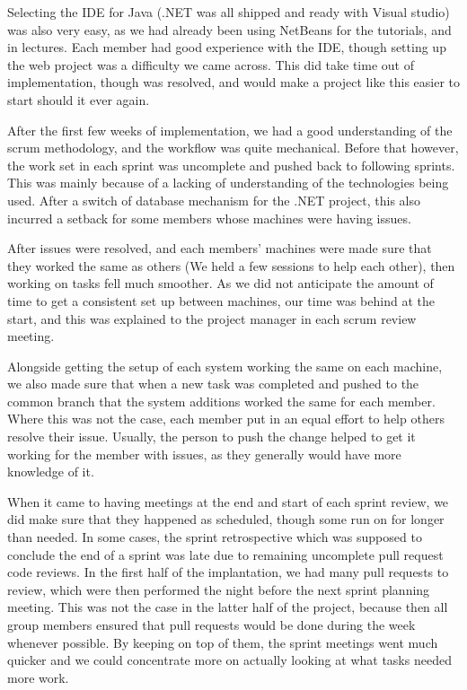 Selecting the IDE for Java (.NET was all shipped and ready with Visual studio) was also very easy, as we had already been using NetBeans for the tutorials, and in lectures. Each member had good experience with the IDE, though setting up the web project was a difficulty we came across. This did take time out of implementation, though was resolved, and would make a project like this easier to start should it ever again. \par
After the first few weeks of implementation, we had a good understanding of the scrum methodology, and the workflow was quite mechanical. Before that however, the work set in each sprint was uncomplete and pushed back to following sprints. This was mainly because of a lacking of understanding of the technologies being used. After a switch of database mechanism for the .NET project, this also incurred a setback for some members whose machines were having issues. \par
After issues were resolved, and each members’ machines were made sure that they worked the same as others (We held a few sessions to help each other), then working on tasks fell much smoother. As we did not anticipate the amount of time to get a consistent set up between machines, our time was behind at the start, and this was explained to the project manager in each scrum review meeting. \par
Alongside getting the setup of each system working the same on each machine, we also made sure that when a new task was completed and pushed to the common branch that the system additions worked the same for each member. Where this was not the case, each member put in an equal effort to help others resolve their issue. Usually, the person to push the change helped to get it working for the member with issues, as they generally would have more knowledge of it. \par
When it came to having meetings at the end and start of each sprint review, we did make sure that they happened as scheduled, though some run on for longer than needed. In some cases, the sprint retrospective which was supposed to conclude the end of a sprint was late due to remaining uncomplete pull request code reviews. In the first half of the implantation, we had many pull requests to review, which were then performed the night before the next sprint planning meeting. This was not the case in the latter half of the project, because then all group members ensured that pull requests would be done during the week whenever possible. By keeping on top of them, the sprint meetings went much quicker and we could concentrate more on actually looking at what tasks needed more work. \par
